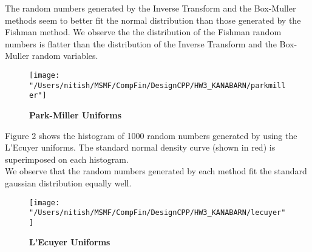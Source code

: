 \documentclass[letterpaper,twoside,11pt,fleqn]{article}
\begin{document}
The random numbers generated by the Inverse Transform and the Box-Muller methods seem to better fit the normal distribution than those generated by the Fishman method.  We observe the the distribution of the Fishman random numbers is flatter than the distribution of the Inverse Transform and the Box-Muller random variables. \\

\begin{figure}[htbp]
\begin{center}
\texttt{[image: "/Users/nitish/MSMF/CompFin/DesignCPP/HW3\_KANABARN/parkmiller"]}
\caption{{\bf Park-Miller Uniforms}}
\label{Figure_1}
\end{center}
\end{figure}


Figure 2 shows the histogram of 1000 random numbers generated by using the L'Ecuyer uniforms.  The standard normal density curve (shown in red) is superimposed on each histogram. \\

We observe that the random numbers generated by each method fit the standard gaussian distribution equally well.

\begin{figure}[htbp]
\begin{center}
\texttt{[image: "/Users/nitish/MSMF/CompFin/DesignCPP/HW3\_KANABARN/lecuyer"]}
\caption{{\bf L'Ecuyer Uniforms}}
\label{Figure_2}
\end{center}
\end{figure}

\clearpage
\end{document}
